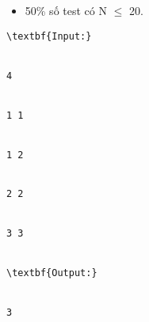 \begin{itemize}
	\item     50\% số test có N  $\le$  20.   
\end{itemize}
\begin{verbatim}
\textbf{Input:}


4


1 1


1 2


2 2


3 3


\textbf{Output:}


3\end{verbatim}